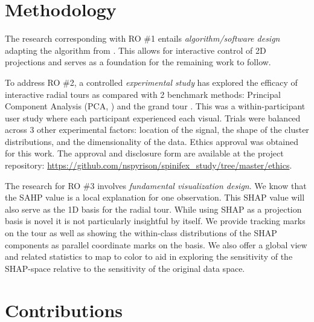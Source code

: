 \documentclass{template/monashthesis}
\begin{document}
\hypertarget{methodology}{%
\section{Methodology}\label{methodology}}

The research corresponding with RO \#1 entails \emph{algorithm/software design} adapting the algorithm from \textcite{cook_manual_1997}. This allows for interactive control of 2D projections and serves as a foundation for the remaining work to follow.

To address RO \#2, a controlled \emph{experimental study} has explored the efficacy of interactive radial tours as compared with 2 benchmark methods: Principal Component Analysis (PCA, \textcite{pearson_liii._1901}) and the grand tour \autocite{asimov_grand_1985}. This was a within-participant user study where each participant experienced each visual. Trials were balanced across 3 other experimental factors: location of the signal, the shape of the cluster distributions, and the dimensionality of the data. Ethics approval was obtained for this work. The approval and disclosure form are available at the project repository: \url{https://github.com/nspyrison/spinifex_study/tree/master/ethics}.

The research for RO \#3 involves \emph{fundamental visualization design}. We know that the SAHP value is a local explanation for one observation. This SHAP value will also serve as the 1D basis for the radial tour. While using SHAP as a projection basis is novel it is not particularly insightful by itself. We provide tracking marks on the tour as well as showing the within-class distributions of the SHAP components as parallel coordinate marks on the basis. We also offer a global view and related statistics to map to color to aid in exploring the sensitivity of the SHAP-space relative to the sensitivity of the original data space.

\hypertarget{contributions}{%
\section{Contributions}\label{contributions}}
\end{document}
